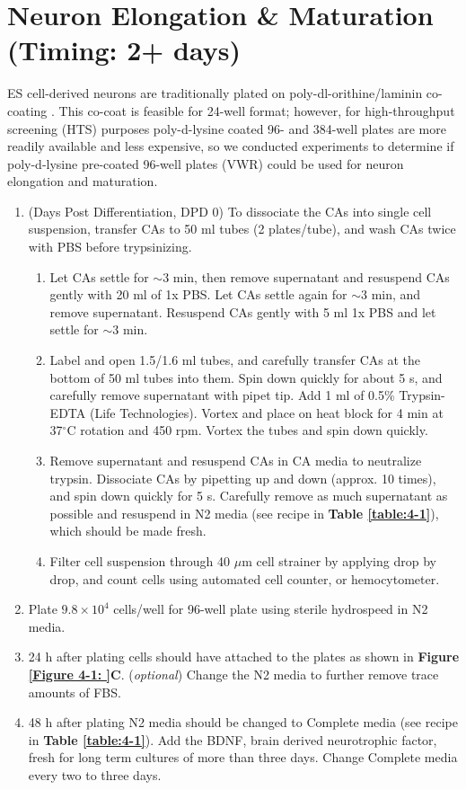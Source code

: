 \section{Neuron Elongation \& Maturation (Timing: 2+ days)}

ES cell-derived neurons are traditionally plated on poly-dl-orithine/laminin co-coating \cite{Bibel2007,Kiris2011,Wu2012}. This co-coat is feasible for 24-well format; however, for high-throughput screening (HTS) purposes poly-d-lysine coated 96- and 384-well plates are more readily available and less expensive, so we conducted experiments to determine if poly-d-lysine pre-coated 96-well plates (VWR) could be used for neuron elongation and maturation.

\begin{enumerate}
\item (Days Post Differentiation, DPD 0) To dissociate the CAs into single cell suspension, transfer CAs to 50 ml tubes (2 plates/tube), and  wash CAs twice with PBS before trypsinizing.
  \begin{enumerate}
  \item Let CAs settle for $\sim$3 min, then remove supernatant and resuspend CAs gently with 20 ml of 1x PBS. Let CAs settle again for $\sim$3 min, and remove supernatant. Resuspend CAs gently with 5 ml 1x PBS and let settle for $\sim$3 min.
  \item Label and open 1.5/1.6 ml tubes, and carefully transfer CAs at the bottom of 50 ml tubes into them. Spin down quickly for about 5 s, and carefully remove supernatant with pipet tip. Add 1 ml of 0.5\% Trypsin-EDTA (Life Technologies). Vortex and place on heat block for 4 min at 37$^{\circ}$C rotation and 450 rpm. Vortex the tubes and spin down quickly.
  \item Remove supernatant and resuspend CAs in CA media to neutralize trypsin. Dissociate CAs by pipetting up and down (approx. 10 times), and spin down quickly for 5 s. Carefully remove as much supernatant as possible and resuspend in N2 media (see recipe in \textbf{Table \ref{table:4-1}}), which should be made fresh.
  \item Filter cell suspension through 40 \( \mu \)m cell strainer by applying drop by drop\footnotemark, and count cells using automated cell counter, or hemocytometer. 
  \end{enumerate}
\item Plate \(9.8 \times 10^4\) cells/well for 96-well plate using sterile hydrospeed in N2 media\footnotemark. 
\item 24 h after plating cells should have attached to the plates as shown in \textbf{Figure \ref{Figure 4-1: }C}. (\emph{optional}) Change the N2 media to further remove trace amounts of FBS.
\item 48 h after plating N2 media should be changed to Complete media (see recipe in \textbf{Table \ref{table:4-1}}). Add the BDNF, brain derived neurotrophic factor, fresh for long term cultures of more than three days. Change Complete media every two to three days.
\end{enumerate}

